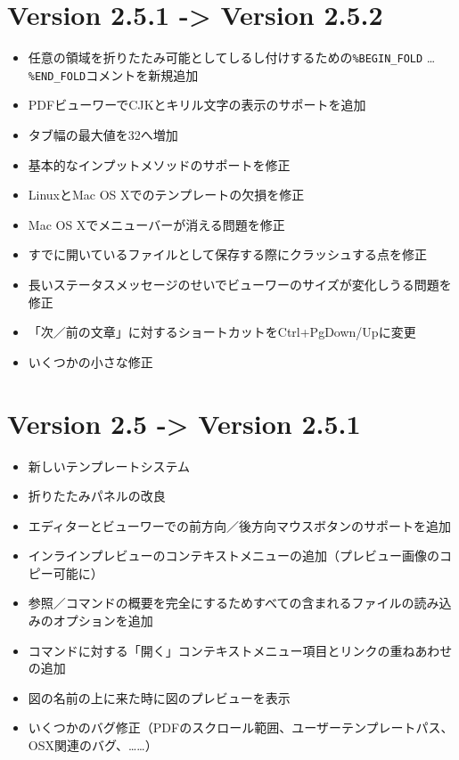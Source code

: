 \section{Version 2.5.1 -\textgreater{} Version 2.5.2}

\begin{itemize}
\item
  任意の領域を折りたたみ可能としてしるし付けするための\verb+%BEGIN_FOLD+
  \ldots{} \verb+%END_FOLD+コメントを新規追加
\item
  PDFビューワーでCJKとキリル文字の表示のサポートを追加
\item
  タブ幅の最大値を32へ増加
\item
  基本的なインプットメソッドのサポートを修正
\item
  LinuxとMac OS Xでのテンプレートの欠損を修正
\item
  Mac OS Xでメニューバーが消える問題を修正
\item
  すでに開いているファイルとして保存する際にクラッシュする点を修正
\item
  長いステータスメッセージのせいでビューワーのサイズが変化しうる問題を修正
\item
  「次／前の文章」に対するショートカットをCtrl+PgDown/Upに変更
\item
  いくつかの小さな修正
\end{itemize}

\section{Version 2.5 -\textgreater{} Version 2.5.1}

\begin{itemize}
\item
  新しいテンプレートシステム
\item
  折りたたみパネルの改良
\item
  エディターとビューワーでの前方向／後方向マウスボタンのサポートを追加
\item
  インラインプレビューのコンテキストメニューの追加（プレビュー画像のコピー可能に）
\item
  参照／コマンドの概要を完全にするためすべての含まれるファイルの読み込みのオプションを追加
\item
  \verb++コマンドに対する「開く」コンテキストメニュー項目とリンクの重ねあわせの追加
\item
  図の名前の上に来た時に図のプレビューを表示
\item
  いくつかのバグ修正（PDFのスクロール範囲、ユーザーテンプレートパス、OSX関連のバグ、……）
\end{itemize}

